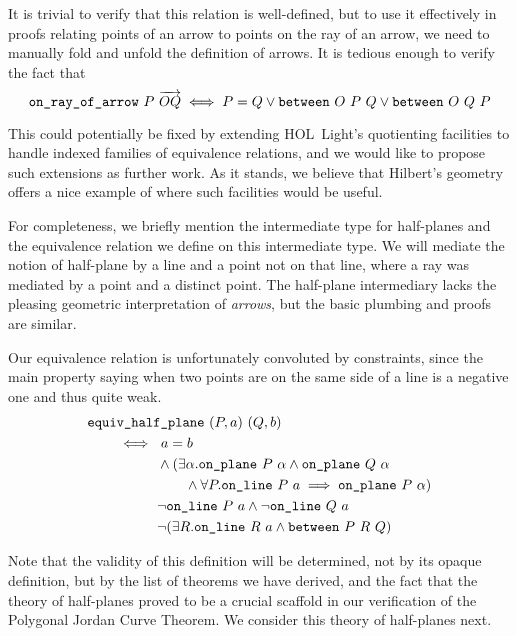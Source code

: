 It is trivial to verify that this relation is well-defined, but to use it effectively in proofs relating points of an arrow to points on the ray of an arrow, we need to manually fold and unfold the definition of arrows. It is tedious enough to verify the fact that
\begin{equation}
  \texttt{on\_ray\_of\_arrow}\ P\ \overrightarrow{OQ} \iff P = Q \vee \texttt{between}\ O\ P\ Q \vee \texttt{between}\ O\ Q\ P
\end{equation}

This could potentially be fixed by extending HOL~Light's quotienting facilities to handle indexed families of equivalence relations, and we would like to propose such extensions as further work. As it stands, we believe that Hilbert's geometry offers a nice example of where such facilities would be useful.

For completeness, we briefly mention the intermediate type for half-planes and the equivalence relation we define on this intermediate type. We will mediate the notion of half-plane by a line and a point not on that line, where a ray was mediated by a point and a distinct point. The half-plane intermediary lacks the pleasing geometric interpretation of \emph{arrows}, but the basic plumbing and proofs are similar. 

Our equivalence relation is unfortunately convoluted by constraints, since the main property saying when two points are on the same side of a line is a negative one and thus quite weak.
\begin{equation}\label{eq:SameSidePlaneDef}
  \begin{split}
    & \code{equiv\_half\_plane}\ (P,a)\ (Q,b)\\
    & \qquad\iff\ a=b \\
    & \qquad\quad\qquad \wedge (\exists \alpha. \code{on\_plane}\ P\ \alpha \wedge \code{on\_plane}\ Q\ \alpha\\
    & \qquad\quad\qquad\qquad \wedge \forall P. \code{on\_line}\ P\ a \implies \code{on\_plane}\ P\ \alpha)\\
    & \qquad\quad\qquad \neg\code{on\_line}\ P\ a \wedge \neg\code{on\_line}\ Q\ a\\
    & \qquad\quad\qquad \neg(\exists R. \code{on\_line}\ R\ a \wedge \between{P}{R}{Q})
  \end{split}
\end{equation}

Note that the validity of this definition will be determined, not by its opaque definition, but by the list of theorems we have derived, and the fact that the theory of half-planes proved to be a crucial scaffold in our verification of the Polygonal Jordan Curve Theorem. We consider this theory of half-planes next.

